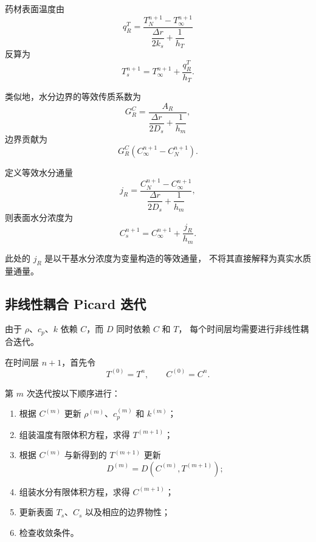 \documentclass[UTF8,a4paper,12pt]{ctexart}
\begin{document}
药材表面温度由
\begin{equation}
q_R^T
=
\frac{T_N^{n+1}-T_{\infty}^{n+1}}
{\dfrac{\Delta r}{2k_s}+\dfrac{1}{h_T}}
\end{equation}
反算为
\begin{equation}
T_s^{n+1}
=
T_{\infty}^{n+1}
+
\frac{q_R^T}{h_T}.
\end{equation}

类似地，水分边界的等效传质系数为
\begin{equation}
G_R^C
=
\frac{A_R}
{\dfrac{\Delta r}{2D_s}+\dfrac{1}{h_m}},
\end{equation}
边界贡献为
\begin{equation}
G_R^C
\left(
C_{\infty}^{n+1}-C_N^{n+1}
\right).
\end{equation}

定义等效水分通量
\begin{equation}
j_R
=
\frac{C_N^{n+1}-C_{\infty}^{n+1}}
{\dfrac{\Delta r}{2D_s}+\dfrac{1}{h_m}},
\end{equation}
则表面水分浓度为
\begin{equation}
C_s^{n+1}
=
C_{\infty}^{n+1}
+
\frac{j_R}{h_m}.
\end{equation}

此处的 $j_R$ 是以干基水分浓度为变量构造的等效通量，
不将其直接解释为真实水质量通量。

\subsection{非线性耦合 Picard 迭代}

由于 $\rho$、$c_p$、$k$ 依赖 $C$，而 $D$ 同时依赖 $C$ 和 $T$，
每个时间层均需要进行非线性耦合迭代。

在时间层 $n+1$，首先令
\begin{equation}
T^{(0)}=T^n,\qquad C^{(0)}=C^n.
\end{equation}

第 $m$ 次迭代按以下顺序进行：

\begin{enumerate}
  \item 根据 $C^{(m)}$ 更新 $\rho^{(m)}$、$c_p^{(m)}$ 和 $k^{(m)}$；
  \item 组装温度有限体积方程，求得 $T^{(m+1)}$；
  \item 根据 $C^{(m)}$ 与新得到的 $T^{(m+1)}$ 更新
  \[
  D^{(m)}=D\left(C^{(m)},T^{(m+1)}\right);
  \]
  \item 组装水分有限体积方程，求得 $C^{(m+1)}$；
  \item 更新表面 $T_s$、$C_s$ 以及相应的边界物性；
  \item 检查收敛条件。
\end{enumerate}
\end{document}
